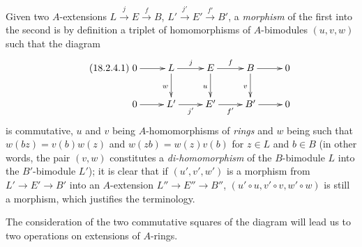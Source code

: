 \begin{env}[18.2.4]
\label{0.18.2.4}
Given two $A$-extensions $L\xrightarrow{j} E\xrightarrow{f} B$, $L'\xrightarrow{j'} E'\xrightarrow{f'} B'$, a \emph{morphism} of the first into the second is by definition a triplet of homomorphisms of $A$-bimodules $(u,v,w)$ such that the diagram
\begin{equation}
\tag{18.2.4.1}
  \label{0.18.2.4.1}
  \xymatrix{
    0\ar[r] & L\ar[r]^j\ar[d]_w & E\ar[r]^f\ar[d]_u & B\ar[r]\ar[d]_v & 0\\
    0\ar[r] & L'\ar[r]_{j'} & E'\ar[r]_{f'} & B'\ar[r] & 0
  }
\end{equation}
is commutative, $u$ and $v$ being $A$-homomorphisms of \emph{rings} and $w$ being such that $w(bz)=v(b)w(z)$ and $w(zb)=w(z)v(b)$ for $z\in L$ and $b\in B$ (in other words, the pair $(v,w)$ constitutes a \emph{di-homomorphism} of the $B$-bimodule $L$ into the $B'$-bimodule $L'$);
it is clear that if $(u',v',w')$ is a morphism from $L'\to E'\to B'$ into an $A$-extension $L''\to E''\to B''$, $(u'\circ u,v'\circ v,w'\circ w)$ is still a morphism, which justifies the terminology.

The consideration of the two commutative squares of the diagram  will lead us to two operations on extensions of $A$-rings.
\end{env}

